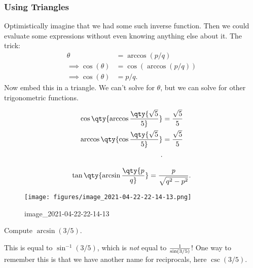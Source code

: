 \hypertarget{using-triangles}{%
\subsubsection{Using Triangles}\label{using-triangles}}

\begin{remark}

Optimistically imagine that we had some such inverse function. Then we
could evaluate some expressions without even knowing anything else about
it. The trick:
\begin{align*}
\theta &= \arccos(p/q) \\
\implies \cos(\theta) &= \cos(\arccos(p/q)) \\
\implies \cos(\theta) &= p/q
.\end{align*}
Now embed this in a triangle. We can't solve for \(\theta\), but we can
solve for other trigonometric functions.

\end{remark}

\begin{exercise}

\begin{align*}
\cos\qty{ \arccos\qty{ \sqrt 5 \over 5 } } &= {\sqrt 5 \over 5} \\
\arccos\qty{ \cos \qty{ \sqrt 5 \over 5 } } &= {\sqrt 5 \over 5} \\
.\end{align*}

\end{exercise}

\begin{exercise}

\begin{align*}
\tan\qty{ \arcsin\qty{ p \over q } } = {p \over \sqrt{q^2 - p^2} }
.\end{align*}

\begin{figure}
\centering
\texttt{[image: figures/image\_2021-04-22-22-14-13.png]}
\caption{image\_2021-04-22-22-14-13}
\end{figure}

\end{exercise}

\begin{exercise}

Compute \(\arcsin(3/5)\).

\begin{warnings}

This is equal to \(\sin^{-1}(3/5)\), which is \emph{not} equal to
\({1\over \sin(3/5)}\)! One way to remember this is that we have another
name for reciprocals, here \(\csc(3/5)\).

\end{warnings}

\end{exercise}

